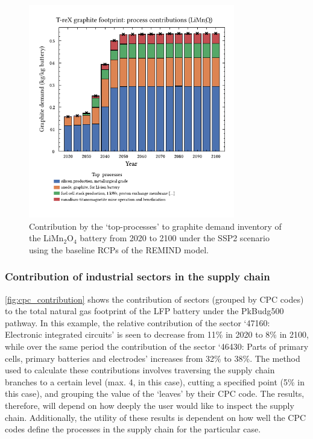 \begin{figure}[H]
    \centering
    \includegraphics[width=9cm]{figures/T-reX-wastefootprint-processcontributions.pdf}
    \caption{Contribution by the `top-processes' to graphite demand inventory of the LiMn\(_2\)O\(_4\) battery from 2020 to 2100 under the SSP2 scenario using the baseline RCPs of the REMIND model.}\label{fig:top_contribution}
\end{figure}


\subsubsection{Contribution of industrial sectors in the supply chain}\label{sec:results-case_study-topsectors}

\autoref{fig:cpc_contribution} shows the contribution of sectors (grouped by CPC codes) to the total natural gas footprint of the LFP battery under the PkBudg500 pathway. In this example, the relative contribution of the sector `47160: Electronic integrated circuits' is seen to decrease from 11\% in 2020 to 8\% in 2100, while over the same period the contribution of the sector `46430: Parts of primary cells, primary batteries and electrodes' increases from 32\% to 38\%. The method used to calculate these contributions involves traversing the supply chain branches to a certain level (max. 4, in this case), cutting a specified point (5\% in this case), and grouping the value of the `leaves' by their CPC code. The results, therefore, will depend on how deeply the user would like to inspect the supply chain. Additionally, the utility of these results is dependent on how well the CPC codes define the processes in the supply chain for the particular case.

